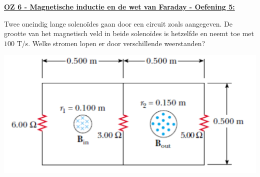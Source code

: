 \textbf{\underline{OZ 6 - Magnetische inductie en de wet van Faraday - Oefening 5:}}
\vspace{0.5cm}

    Twee oneindig lange solenoïdes gaan door een circuit zoals aangegeven. De grootte van het magnetisch veld in beide solenoïdes is hetzelfde en neemt toe met $100$ T/s. Welke stromen lopen er door verschillende weerstanden?

    \begin{center}
        \includegraphics[scale = 0.3]{oz06/resources/Oz6Oef5.png}
    \end{center}

